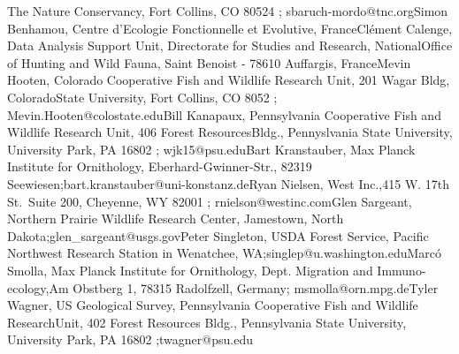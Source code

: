 \documentclass[
  letterpaper,
  DIV=11,
  numbers=noendperiod]{scrreprt}
\begin{document}
{The Nature Conservancy, Fort Collins, CO 80524 ;
sbaruch-mordo@tnc.orgSimon Benhamou, Centre d'Ecologie Fonctionnelle et
Evolutive, FranceClément Calenge, Data Analysis Support Unit,
Directorate for Studies and Research, NationalOffice of Hunting and Wild
Fauna, Saint Benoist - 78610 Auffargis, FranceMevin Hooten, Colorado
Cooperative Fish and Wildlife Research Unit, 201 Wagar Bldg,
ColoradoState University, Fort Collins, CO 8052 ;
Mevin.Hooten@colostate.eduBill Kanapaux, Pennsylvania Cooperative Fish
and Wildlife Research Unit, 406 Forest ResourcesBldg., Pennyslvania
State University, University Park, PA 16802 ; wjk15@psu.eduBart
Kranstauber, Max Planck Institute for Ornithology,
Eberhard-Gwinner-Str., 82319
Seewiesen;bart.kranstauber@uni-konstanz.deRyan Nielsen, West Inc.,415 W.
17th St.~Suite 200, Cheyenne, WY 82001 ; rnielson@westinc.comGlen
Sargeant, Northern Prairie Wildlife Research Center, Jamestown, North
Dakota;glen\_sargeant@usgs.govPeter Singleton, USDA Forest Service,
Pacific Northwest Research Station in Wenatchee,
WA;singlep@u.washington.eduMarcó Smolla, Max Planck Institute for
Ornithology, Dept. Migration and Immuno-ecology,Am Obstberg 1, 78315
Radolfzell, Germany; msmolla@orn.mpg.deTyler Wagner, US Geological
Survey, Pennsylvania Cooperative Fish and Wildlife ResearchUnit, 402
Forest Resources Bldg., Pennsylvania State University, University Park,
PA 16802 ;twagner@psu.edu}
\end{document}
